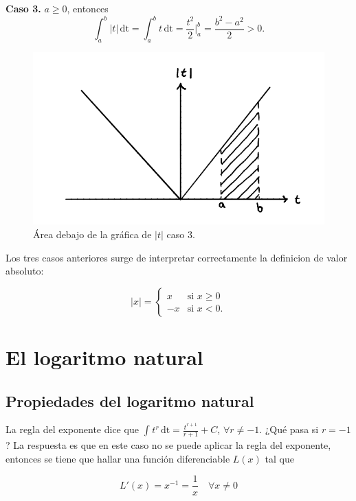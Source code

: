 \documentclass{article}
\numberwithin{equation}{section}
\newcommand{\col}[1]{\textcolor{ProcessBlue}{#1}}
\begin{document}
\textbf{Caso 3.} $a\geq 0$, entonces 
$$\int_{a}^{b} \! {|t|} \, \mathrm{dt}=\int_{a}^{b} \! {t} \, \mathrm{dt}=\frac{t^2}{2}\Big|_a^b=\frac{b^2-a^2}{2}>0.$$

\begin{figure}[h]
    \centering
    \includegraphics[scale=0.3]{images/fig5.png}
    \caption{Área debajo de la gráfica de $|t|$ caso 3.}
    \label{fig:fig5}
\end{figure}

Los tres casos anteriores surge de interpretar correctamente la definicion de valor absoluto:

$$|x|=\left\{
    \begin{array}{ll}
        x  & \mbox{si } x\geq 0\\
        -x & \mbox{si } x<0.
    \end{array}
\right.$$

\newpage

\section{\col{El logaritmo natural}}

\subsection{\col{Propiedades del logaritmo natural}}

La regla del exponente dice que $\int_{}^{} \! {t^r} \, \mathrm{dt}=\frac{t^{r+1}}{r+1}+C$, $\forall r\neq -1$. ¿Qué pasa si $r=-1$? La respuesta es que en este caso no se puede aplicar la regla del exponente, entonces se tiene que hallar una función diferenciable $L(x)$ tal que 

$$ L'(x)=x^{-1}=\frac{1}{x} \quad \forall x\neq 0 $$
\end{document}
